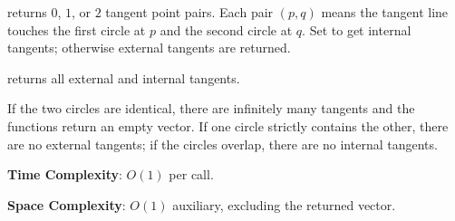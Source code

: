 \begin{compactitem}
  \item {} returns $0$, $1$, or $2$ tangent point pairs. Each pair $(p, q)$ means the tangent line touches the first circle at $p$ and the second circle at $q$. Set  to get internal tangents; otherwise external tangents are returned.
  \item {} returns all external and internal tangents.
\end{compactitem}

If the two circles are identical, there are infinitely many tangents and the functions return an empty vector. If one circle strictly contains the other, there are no external tangents; if the circles overlap, there are no internal tangents.

\textbf{Time Complexity}: $O(1)$ per call.

\textbf{Space Complexity}: $O(1)$ auxiliary, excluding the returned vector.

